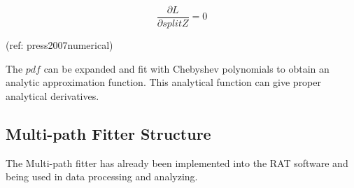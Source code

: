 \[
\frac{\partial L}{\partial splitZ} = 0
\]

(ref: press2007numerical)


The $pdf$ can be expanded and fit with Chebyshev polynomials to obtain an analytic approximation function\cite{press2007numerical}. This analytical function can give proper analytical derivatives.

\subsection{Multi-path Fitter Structure}
The Multi-path fitter has already been implemented into the RAT software and being used in data processing and analyzing.

